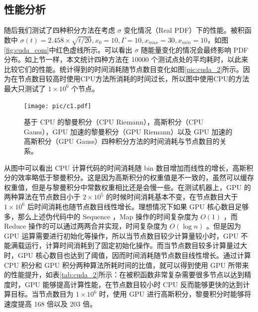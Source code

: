\subsection{性能分析}

随后我们测试了四种积分方法在考虑 $\sigma$ 变化情况（Real PDF）下的性能。被积函数中 $\sigma(t)=2.458\times\sqrt{t/20}, x_0=10, \Gamma=10,x_{max}=30,x_{min}=10$，如图\ref{fig:cuda_com}中红色虚线所示。可以看出 $\sigma$ 随能量变化的情况会最终影响 PDF 分布。如上节一样，本文统计四种方法在 10000 个测试点处的平均耗时，以此来比较它们的性能。统计得到的时间消耗随节点数目变化如图\ref{pic:cuda_2}所示。因为在节点数目较高时使用CPU方法所消耗的时间过长，所以图中使用CPU的方法最大只测试了 $1\times10^6$ 个节点。

\begin{figure}
    \centering
    \texttt{[image: pic/c1.pdf]}
    \caption{ 基于 CPU 的黎曼积分（CPU Riemann），高斯积分（CPU Gauss），GPU 加速的黎曼积分（GPU Riemann）以及 GPU 加速的高斯积分（GPU Gauss）四种积分方法的时间消耗与节点数目的关系。}
    \label{fig:cuda_2}
\end{figure}

从图中可以看出 CPU 计算代码的时间消耗随 bin 数目增加而线性的增长，高斯积分的效率略低于黎曼积分。这是因为高斯积分的权重值是不一致的，虽然可以缓存权重值，但是与黎曼积分中常数权重相比还是会慢一些。在测试机器上，GPU 的两种算法在节点数目小于 $2\times10^5$ 的时候时间消耗基本不变，在节点数目大于 $1\times10^6$ 后时间消耗也随节点数目线性增长。理想情况下如果 GPU 核心数目足够多，那么上述伪代码中的 Sequence ，Map 操作的时间复杂度为 $O(1)$ ，而 Reduce 操作的可以通过两两合并实现，时间复杂度为 $O(\log{n})$ 。但是因为 GPU 运算需要进行初始化等操作，所以当节点数目较少计算量较小时，GPU 不能满载运行，计算时间消耗到了固定初始化操作。而当节点数目较多计算量过大时，GPU 核心数目也达到了阈值，因而时间消耗随节点数目线性增长。通过计算 CPU 积分和 GPU 积分两种算法所耗时间的比值，就可以得到使用 GPU 所带来的性能提升，如表\ref{tab:cuda_2}所示：在被积函数非常复杂需要很多节点以达到精度时，GPU 能够提高计算性能，在节点数目较小时 CPU 反而能够更快的达到计算目标。当节点数目为 $1\times10^6$ 时，使用 GPU 进行高斯积分，黎曼积分时能够将速度提高 168 倍以及 203 倍。

